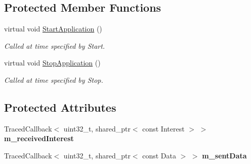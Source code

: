 \subsection*{Protected Member Functions}
\begin{DoxyCompactItemize}
\item 
virtual void \hyperlink{classns3_1_1ndn_1_1SpontaneousProducer_a6788586e0dd8a1183a5d174c69e2f687}{Start\+Application} ()\hypertarget{classns3_1_1ndn_1_1SpontaneousProducer_a6788586e0dd8a1183a5d174c69e2f687}{}\label{classns3_1_1ndn_1_1SpontaneousProducer_a6788586e0dd8a1183a5d174c69e2f687}

\begin{DoxyCompactList}\small\item\em Called at time specified by Start. \end{DoxyCompactList}\item 
virtual void \hyperlink{classns3_1_1ndn_1_1SpontaneousProducer_acb375ea412bb978754393fca0416a3fa}{Stop\+Application} ()\hypertarget{classns3_1_1ndn_1_1SpontaneousProducer_acb375ea412bb978754393fca0416a3fa}{}\label{classns3_1_1ndn_1_1SpontaneousProducer_acb375ea412bb978754393fca0416a3fa}

\begin{DoxyCompactList}\small\item\em Called at time specified by Stop. \end{DoxyCompactList}\end{DoxyCompactItemize}
\subsection*{Protected Attributes}
\begin{DoxyCompactItemize}
\item 
Traced\+Callback$<$ uint32\+\_\+t, shared\+\_\+ptr$<$ const Interest $>$ $>$ {\bfseries m\+\_\+received\+Interest}\hypertarget{classns3_1_1ndn_1_1SpontaneousProducer_ab3a77685fc1f4eb78f4e29031207fae2}{}\label{classns3_1_1ndn_1_1SpontaneousProducer_ab3a77685fc1f4eb78f4e29031207fae2}

\item 
Traced\+Callback$<$ uint32\+\_\+t, shared\+\_\+ptr$<$ const Data $>$ $>$ {\bfseries m\+\_\+sent\+Data}\hypertarget{classns3_1_1ndn_1_1SpontaneousProducer_ad43f146c7effa5de8c4b2fdd3832060c}{}\label{classns3_1_1ndn_1_1SpontaneousProducer_ad43f146c7effa5de8c4b2fdd3832060c}

\end{DoxyCompactItemize}



